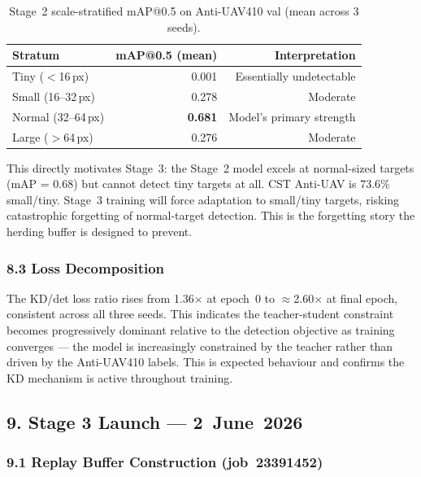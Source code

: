 \begin{table}[h]
\centering
\caption{Stage~2 scale-stratified mAP@0.5 on Anti-UAV410 val (mean across 3 seeds).}
\label{tab:s2_scale}
\small
\begin{tabular}{lrr}
\hline
\textbf{Stratum} & \textbf{mAP@0.5 (mean)} & \textbf{Interpretation} \\
\hline
Tiny ($<$16\,px)    & 0.001 & Essentially undetectable \\
Small (16--32\,px)  & 0.278 & Moderate \\
Normal (32--64\,px) & \textbf{0.681} & Model's primary strength \\
Large ($>$64\,px)   & 0.276 & Moderate \\
\hline
\end{tabular}
\end{table}

\noindent This directly motivates Stage~3: the Stage~2 model excels at
normal-sized targets (mAP = 0.68) but cannot detect tiny targets at all.
CST Anti-UAV is 73.6\% small/tiny. Stage~3 training will force adaptation
to small/tiny targets, risking catastrophic forgetting of normal-target
detection. This is the forgetting story the herding buffer is designed to prevent.

\subsubsection*{8.3 Loss Decomposition}

The KD/det loss ratio rises from 1.36$\times$ at epoch~0 to
$\approx$2.60$\times$ at final epoch, consistent across all three seeds.
This indicates the teacher-student constraint becomes progressively
dominant relative to the detection objective as training converges —
the model is increasingly constrained by the teacher rather than
driven by the Anti-UAV410 labels. This is expected behaviour and
confirms the KD mechanism is active throughout training.

\subsection*{9. Stage 3 Launch — 2~June~2026}

\subsubsection*{9.1 Replay Buffer Construction (job~23391452)}

